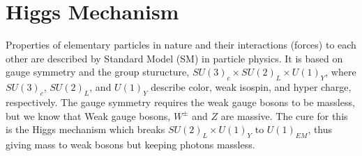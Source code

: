 \section{Higgs Mechanism}

Properties of elementary particles in nature and their interactions (forces)
to each other are described by Standard Model (SM) in particle physics. It is 
based on gauge symmetry and the group sturucture, 
$SU(3)_c \times SU(2)_L \times U(1)_Y$, where  $SU(3)_c$, $SU(2)_L$, and $U(1)_Y$  
describe color, weak isospin, and hyper charge, respectively. 
The gauge symmetry requires the weak gauge bosons to be massless,
but we know that Weak gauge bosons, $W^\pm$ and $Z$ are massive. 
The cure for this is the Higgs mechanism which breaks $SU(2)_L \times U(1)_Y$
to $U(1)_{EM}$, thus giving mass to weak bosons but keeping photons massless. 

\newpage
